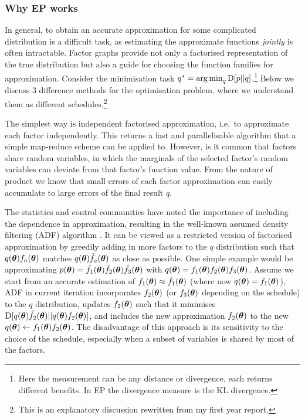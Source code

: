 \subsubsection{Why EP works}
In general, to obtain an accurate approximation for some complicated distribution is a difficult task, as estimating the approximate functions \textit{jointly} is often intractable. Factor graphs provide not only a factorised representation of the true distribution but also a guide for choosing the function families for approximation. Consider the minimisation task $q^* = \operatorname*{arg\,min}_q \mathrm{D}[p || q]$.\footnote{Here the measurement can be any distance or divergence, each returns different benefits. In EP the divergence measure is the KL divergence.} Below we discuss 3 difference methods for the optimisation problem, where we understand them as different schedules.\footnote{This is an explanatory discussion rewritten from my first year report.}

The simplest way is independent factorised approximation, i.e.~to approximate each factor independently. This returns a fast and parallelisable algorithm that a simple map-reduce scheme can be applied to. However, is it common that factors share random variables, in which the marginals of the selected factor's random variables can deviate from that factor's function value. From the nature of product we know that small errors of each factor approximation can easily accumulate to large errors of the final result $q$. 

The statistics and control communities have noted the importance of including the dependence in approximation, resulting in the well-known assumed density filtering (ADF) algorithm \citep{maybeck:adf1982}. It can be viewed as a restricted version of factorised approximation by greedily adding in more factors to the $q$ distribution such that $q(\bm{\theta}) f_a(\bm{\theta})$ matches $q(\bm{\theta}) \tilde{f}_a(\bm{\theta})$ as close as possible. One simple example would be approximating $p(\bm{\theta}) = \tilde{f}_1(\bm{\theta}) \tilde{f}_2(\bm{\theta}) \tilde{f}_3(\bm{\theta})$ with $q(\bm{\theta}) = f_1(\bm{\theta}) f_2(\bm{\theta}) f_3(\bm{\theta})$. Assume we start from an accurate estimation of $f_1(\bm{\theta}) \approx \tilde{f}_1(\bm{\theta})$ (where now $q(\bm{\theta}) = f_1(\bm{\theta})$), ADF in current iteration incorporates $f_2(\bm{\theta})$ (or $f_3(\bm{\theta})$ depending on the schedule) to the $q$ distribution, updates $f_2(\bm{\theta})$ such that it minimises $\mathrm{D}[q(\bm{\theta}) \tilde{f}_2(\bm{\theta}) || q(\bm{\theta}) f_2(\bm{\theta})]$,
and includes the new approximation $f_2(\bm{\theta})$ to the new $q(\bm{\theta}) \leftarrow f_1(\bm{\theta}) f_2(\bm{\theta})$. 
The disadvantage of this approach is its sensitivity to the choice of the schedule, especially when a subset of variables is shared by most of the factors. 

